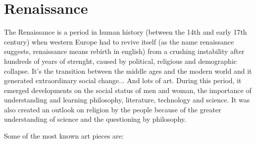 \documentclass{report}
\begin{document}
\section{Renaissance}

The Renaissance is a period in human history (between the 14th and early 17th century) when western Europe had to revive itself (as the name renaissance suggests, renaissance means rebirth in english) from a crushing instability after hundreds of years of strenght, caused by political, religious and demographic collapse.	It's the transition between the middle ages and the modern world and it generated extraordinary social change... And lots of art. During this period, it emerged developments on the social status of men and woman, the importance of understanding and learning philosophy, literature, technology and science.	It was also created an outlook on religion by the people because of the greater understanding of science and the questioning by philosophy. 

Some of the most known art pieces are:
\end{document}
